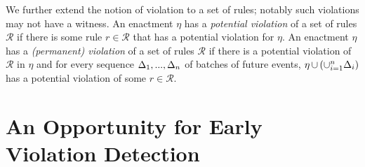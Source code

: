 %
%

We further extend the notion of violation to a set of rules;
notably such violations may not have a witness.
An enactment $\eta$ has a {\em potential violation}
of a set of rules $\mathcal{R}$
if there is some rule $r\in\mathcal{R}$
that has a potential violation for $\eta$.
An enactment $\eta$ has a {\em (permanent) violation}
of a set of rules $\mathcal{R}$
if there is a potential violation of $\mathcal{R}$ in $\eta$
and
for every sequence $\Delta_1,...,\Delta_{n}$ of batches of future events,
$\eta\,{\cup}\,(\cup_{i=1}^n\Delta_i)$ has a potential violation of some $r\in\mathcal{R}$.

\section{An Opportunity for Early Violation Detection}
\label{sec:motiv}


